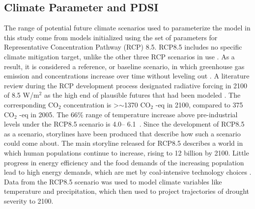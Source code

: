 

\subsection*{Climate Parameter and PDSI}

The range of potential future climate scenarios used to parameterize the model in this study come from models initialized using the set of parameters for Representative Concentration Pathway (RCP) 8.5. RCP8.5 includes no specific climate mitigation target, unlike the other three RCP scenarios in use \citep{Riahi2011}. As a result, it is considered a reference, or baseline scenario, in which greenhouse gas emission and concentrations increase over time without leveling out \citep{Riahi2011}. A literature review during the RCP development process designated radiative forcing in 2100 of 8.5 W/m$^2$ as the high end of plausible futures that had been modeled \citep{VanVuuren2011}. The corresponding $\text{CO}_2$ concentration is \textgreater $\sim$1370 $\text{CO}_2$ -eq in 2100, compared to 375 $\text{CO}_2$ -eq in 2005. The 66\% range of temperature increase above pre-industrial levels under the RCP8.5 scenario is 4.0\textdegree -- 6.1\textdegree \ \citep{Rogelj2012}. Since the development of RCP8.5 as a scenario, storylines have been produced that describe how such a scenario could come about. The main storyline released for RCP8.5 describes a world in which human populations continue to increase, rising to 12 billion by 2100. Little progress in energy efficiency and the food demands of the increasing population lead to high energy demands, which are met by coal-intensive technology choices \citep{Riahi2011}. Data from the RCP8.5 scenario was used to model climate variables like temperature and precipitation, which \citet{Cook2014} then used to project trajectories of drought severity to 2100.

